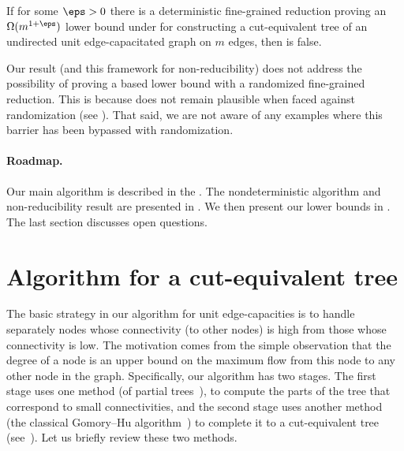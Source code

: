 \begin{theorem}
\label{thm3}
If for some $\eps>0$ there is a deterministic fine-grained reduction proving an $\Omega(m^{1+\eps})$ lower bound under \SETH for constructing a cut-equivalent tree of an undirected unit edge-capacitated graph on $m$ edges, then \NSETH is false.
\end{theorem}

Our result (and this framework for non-reducibility) does not address the possibility of proving a \SETH based lower bound with a randomized fine-grained reduction.
This is because \NSETH does not remain plausible when faced against randomization (see \cite{carmosino2016nondeterministic,Wil16_MASETH}).
That said, we are not aware of any examples where this barrier has been
%
bypassed with randomization.


\paragraph{Roadmap.} Our main algorithm is described in the . The nondeterministic algorithm and non-reducibility result are presented in . We then present our lower bounds in . The last section discusses open questions.


\section{Algorithm for a cut-equivalent tree}
\label{GHU_Alg}

The basic strategy in our algorithm for unit edge-capacities
is to handle separately nodes whose connectivity (to other nodes)
is high from those whose connectivity is low.
The motivation comes from the simple observation that the degree of a node is an upper bound on the maximum flow from this node to any other node in the graph.
%
Specifically, our algorithm has two stages.
The first stage uses one method (of partial trees~\cite{HKP07,BHKP07}),
to compute the parts of the tree that correspond to small connectivities,
and the second stage uses another method
(the classical Gomory--Hu   %
algorithm~\cite{GH61})
to complete it to a cut-equivalent tree (see~).
Let us briefly review these two methods.


